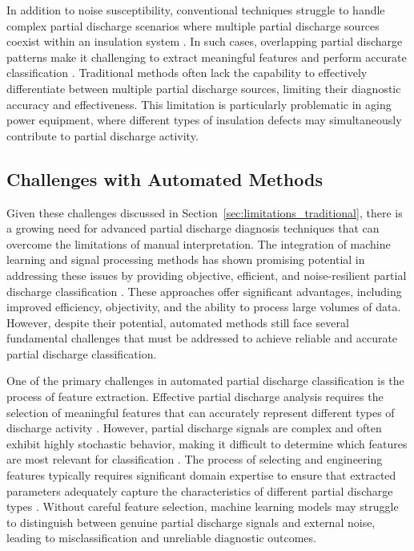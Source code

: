 In addition to noise susceptibility, conventional techniques struggle to handle complex partial discharge scenarios where multiple partial discharge sources coexist within an insulation system \parencite{Baug_2017}. In such cases, overlapping partial discharge patterns make it challenging to extract meaningful features and perform accurate classification \parencite{Biswas_2016, Firuzi_2017}. Traditional methods often lack the capability to effectively differentiate between multiple partial discharge sources, limiting their diagnostic accuracy and effectiveness. This limitation is particularly problematic in aging power equipment, where different types of insulation defects may simultaneously contribute to partial discharge activity.

\subsection{Challenges with Automated Methods}

Given these challenges discussed in Section~\ref{sec:limitations_traditional}, there is a growing need for advanced partial discharge diagnosis techniques that can overcome the limitations of manual interpretation. The integration of machine learning and signal processing methods has shown promising potential in addressing these issues by providing objective, efficient, and noise-resilient partial discharge classification \parencite{Masud_2016, Lu_2020_2}. These approaches offer significant advantages, including improved efficiency, objectivity, and the ability to process large volumes of data. However, despite their potential, automated methods still face several fundamental challenges that must be addressed to achieve reliable and accurate partial discharge classification.

One of the primary challenges in automated partial discharge classification is the process of feature extraction. Effective partial discharge analysis requires the selection of meaningful features that can accurately represent different types of discharge activity \parencite{Long_2024}. However, partial discharge signals are complex and often exhibit highly stochastic behavior, making it difficult to determine which features are most relevant for classification \parencite{Dai_2017}. The process of selecting and engineering features typically requires significant domain expertise to ensure that extracted parameters adequately capture the characteristics of different partial discharge types \parencite{Zhou_2017}. Without careful feature selection, machine learning models may struggle to distinguish between genuine partial discharge signals and external noise, leading to misclassification and unreliable diagnostic outcomes.

